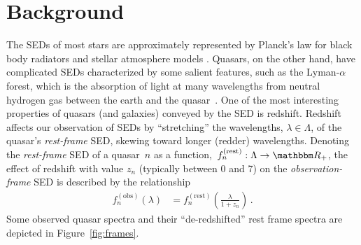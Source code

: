 \documentclass{article} %
\begin{document}
\section{Background}
\label{sec:background}
The SEDs of most stars are approximately represented by Planck's law for black body radiators and stellar atmosphere models \cite{gray2001physical}. 
Quasars, on the other hand, have complicated SEDs characterized by some salient features, such as the Lyman-$\alpha$ forest, which is the absorption of light at many wavelengths from neutral hydrogen gas between the earth and the quasar~\cite{weinberg2003lymanalpha}.  
One of the most interesting properties of quasars (and galaxies) conveyed by the SED is redshift. 
Redshift affects our observation of SEDs by ``stretching'' the wavelengths, ${\lambda \in \Lambda}$, of the quasar's \emph{rest-frame} SED, skewing toward longer (redder) wavelengths.
Denoting the \emph{rest-frame} SED of a quasar~$n$ as a function,~${f_n^{(\text{rest})} : \Lambda \rightarrow \R_+}$, the effect of redshift with value $z_n$ (typically between 0 and 7) on the \emph{observation-frame} SED is described by the relationship 
\begin{align}
  f_n^{(\text{obs})}(\lambda) &= f_n^{(\text{rest})}\left(\frac{\lambda}{1 + z_n}\right) \, .
\end{align}
Some observed quasar spectra and their ``de-redshifted'' rest frame spectra are depicted in Figure~\ref{fig:frames}.
\end{document}
